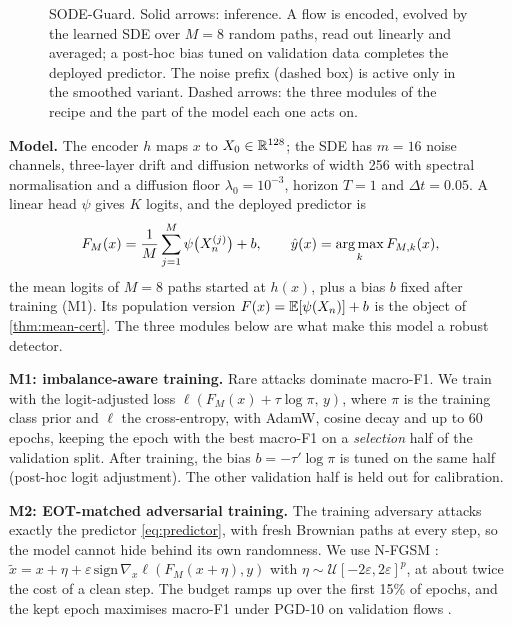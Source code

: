 \begin{figure}[t]
\caption{SODE-Guard. Solid arrows: inference. A flow is encoded, evolved by the
learned SDE over $M=8$ random paths, read out linearly and averaged; a post-hoc
bias tuned on validation data completes the deployed predictor. The noise
prefix (dashed box) is active only in the smoothed variant. Dashed arrows: the
three modules of the recipe and the part of the model each one acts on.}
\label{fig:arch}
\end{figure}

\textbf{Model.} The encoder $h$ maps $x$ to $X_0\in\mathbb{R}^{128}$; the SDE has
$m=16$ noise channels, three-layer drift and diffusion networks of width 256
with spectral normalisation and a diffusion floor $\lambda_0=10^{-3}$, horizon
$T=1$ and $\Delta t=0.05$. A linear head $\psi$ gives $K$ logits, and the
deployed predictor is
\begin{equation}\label{eq:predictor}
  F_M(x)=\frac1M\sum_{j=1}^{M}\psi\bigl(X_n^{(j)}\bigr)+b,\qquad
  \hat y(x)=\operatorname*{arg\,max}_k F_{M,k}(x),
\end{equation}
the mean logits of $M=8$ paths started at $h(x)$, plus a bias $b$ fixed after
training (M1). Its population version $F(x)=\mathbb{E}[\psi(X_n)]+b$ is the object of
\cref{thm:mean-cert}. The three modules below are what make this model a
robust detector.

\textbf{M1: imbalance-aware training.} Rare attacks dominate macro-F1. We train
with the logit-adjusted loss \citep{menon2021logit}
$\ell(F_M(x)+\tau\log\pi,\,y)$, where $\pi$ is the training class prior and
$\ell$ the cross-entropy, with AdamW, cosine decay and up to 60 epochs, keeping
the epoch with the best macro-F1 on a \emph{selection} half of the validation
split. After training, the bias $b=-\tau'\log\pi$ is tuned on the same half
(post-hoc logit adjustment). The other validation half is held out for
calibration.

\textbf{M2: EOT-matched adversarial training.} The training adversary attacks
exactly the predictor \eqref{eq:predictor}, with fresh Brownian paths at every
step, so the model cannot hide behind its own randomness. We use N-FGSM
\citep{dejorge2022nfgsm}: $\tilde x=x+\eta+\varepsilon\,\mathrm{sign}\,\nabla_x
\ell(F_M(x+\eta),y)$ with $\eta\sim\mathcal U[-2\varepsilon,2\varepsilon]^p$, at
about twice the cost of a clean step. The budget ramps up over the first 15\%
of epochs, and the kept epoch maximises macro-F1 under PGD-10 on validation
flows \citep{rice2020overfitting}.

